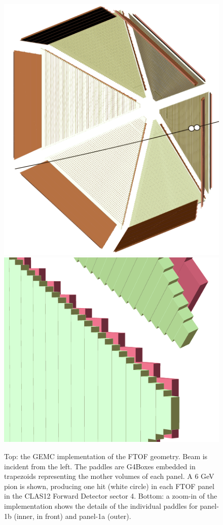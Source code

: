 \begin{figure}
	\centering
	\includegraphics[width=0.99\columnwidth,keepaspectratio]{img/ftofGeometry.png}
	\includegraphics[width=0.99\columnwidth,keepaspectratio]{img/ftofDetail.png}
	\caption{Top: the GEMC implementation of the FTOF geometry. Beam is incident from the left.
             The paddles are G4Boxes embedded in trapezoids
             representing the mother volumes of each panel. A 6 GeV pion is shown, producing one hit (white circle) in each FTOF panel
             in the CLAS12 Forward Detector sector 4.
             Bottom: a zoom-in of the implementation shows the details of the individual paddles for panel-1b (inner,
             in front) and panel-1a (outer). }
	\label{fig:ftofGeometry}
\end{figure}

